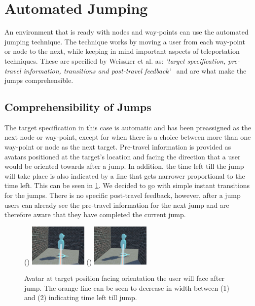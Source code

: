 \section{Automated Jumping}
\label{section AGJ: Automated Jumping}
An environment that is ready with nodes and way-points can use the automated jumping technique. The technique works by moving a user from each way-point or node to the next, while keeping in mind important aspects of teleportation techniques. These are specified by Weissker et al. as: \textit{'target specification, pre-travel information, transitions and post-travel feedback'}~\cite{Weissker2018} and are what make the jumps comprehensible.

\subsection{Comprehensibility of Jumps}
\label{subsection AGJ AJ: Comprehensibility of Jumps}
The target specification in this case is automatic and has been preassigned as the next node or way-point, except for when there is a choice between more than one way-point or node as the next target. Pre-travel information is provided as avatars positioned at the target's location and facing the direction that a user would be oriented towards after a jump. In addition, the time left till the jump will take place is also indicated by a line that gets narrower proportional to the time left. This can be seen in \cref{fig:automated-jumping-feedback}. We decided to go with simple instant transitions for the jumps. There is no specific post-travel feedback, however, after a jump users can already see the pre-travel information for the next jump and are therefore aware that they have completed the current jump. 

\begin{figure}[]
	\centering
	() {\includegraphics[width=0.25\textwidth]{images/automated-jumping-feedback-1.pdf}}
	() {\includegraphics[width=0.25\textwidth]{images/automated-jumping-feedback-2.pdf}} 
	\caption{Avatar at target position facing orientation the user will face after jump. The orange line can be seen to decrease in width between (1) and (2) indicating time left till jump.}
	\label{fig:automated-jumping-feedback}
\end{figure}  

